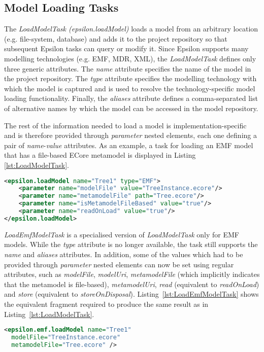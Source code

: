 \subsection{Model Loading Tasks}

The \textit{LoadModelTask (epsilon.loadModel)} loads a model from an arbitrary location (e.g. file-system, database) and adds it to the project repository so that subsequent Epsilon tasks can query or modify it. Since Epsilon supports many modelling technologies (e.g. EMF, MDR, XML), the \textit{LoadModelTask} defines only three generic attributes. The \textit{name} attribute specifies the name of the model in the project repository. The \textit{type} attribute specifies the modelling technology with which the model is captured and is used to resolve the technology-specific model loading functionality. Finally, the \textit{aliases} attribute defines a comma-separated list of alternative names by which the model can be accessed in the model repository.

The rest of the information needed to load a model is implementation-specific and is therefore provided through \textit{parameter} nested elements, each one defining a pair of \textit{name}-\textit{value} attributes. As an example, a task for loading an EMF model that has a file-based ECore metamodel is displayed in Listing \ref{lst:LoadModelTask}.

\begin{lstlisting}[float=tbp, basicstyle=\ttfamily\footnotesize, nolol=true, flexiblecolumns=true, caption=Loading an EMF model using the epsilon.loadModel task, label=lst:LoadModelTask, language=XML]
<epsilon.loadModel name="Tree1" type="EMF">
	<parameter name="modelFile" value="TreeInstance.ecore"/>
	<parameter name="metamodelFile" path="Tree.ecore"/>
	<parameter name="isMetamodelFileBased" value="true"/>
	<parameter name="readOnLoad" value="true"/>
</epsilon.loadModel>
\end{lstlisting}%

\textit{LoadEmfModelTask} is a specialised version of \textit{LoadModelTask} only for EMF models. While the \textit{type} attribute is no longer available, the task still supports the \textit{name} and \textit{aliases} attributes. In addition, some of the values which had to be provided through \textit{parameter} nested elements can now be set using regular attributes, such as \textit{modelFile}, \textit{modelUri}, \textit{metamodelFile} (which implicitly indicates that the metamodel is file-based), \textit{metamodelUri}, \textit{read} (equivalent to \textit{readOnLoad}) and \textit{store} (equivalent to \textit{storeOnDisposal}). Listing~\ref{lst:LoadEmfModelTask} shows the equivalent fragment required to produce the same result as in Listing~\ref{lst:LoadModelTask}.

\begin{lstlisting}[float=tbp, basicstyle=\ttfamily\footnotesize, nolol=true, flexiblecolumns=true, caption=Loading an EMF model using the epsilon.emf.loadModel task, label=lst:LoadEmfModelTask, language=XML]
<epsilon.emf.loadModel name="Tree1"
  modelFile="TreeInstance.ecore"
  metamodelFile="Tree.ecore" />
\end{lstlisting}

